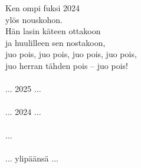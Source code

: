 Ken ompi fuksi 2024 \\ ylös nouskohon. \\ Hän lasin käteen ottakoon \\ ja huulilleen sen nostakoon, \\ juo pois, juo pois, juo pois, juo pois, \\ juo herran tähden pois -- juo pois! \\
\hspace{10mm} \\ ... 2025 ... \\
\hspace{10mm} \\ ... 2024 ... \\
\hspace{10mm} \\ ... \\
\hspace{10mm} \\ ... ylipäänsä ... 
